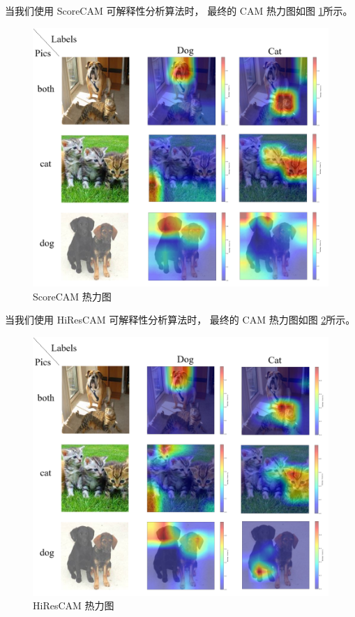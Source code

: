 \documentclass[supercite]{Experimental_Report}
\theoremstyle{definition}
\begin{document}
当我们使用 ScoreCAM 可解释性分析算法时，
最终的 CAM 热力图如图 \ref{ScoreCAM热力图}所示。
\begin{figure}[H]
	\begin{center}
		\includegraphics[scale=0.4]{../images/ScoreCAM热力图.png}
		\caption{ScoreCAM 热力图}
		\label{ScoreCAM热力图}
	\end{center}
\end{figure}

当我们使用 HiResCAM 可解释性分析算法时，
最终的 CAM 热力图如图 \ref{HiResCAM热力图}所示。
\begin{figure}[H]
	\begin{center}
		\includegraphics[scale=0.4]{../images/HiResCAM热力图.png}
		\caption{HiResCAM 热力图}
		\label{HiResCAM热力图}
	\end{center}
\end{figure}
\end{document}
